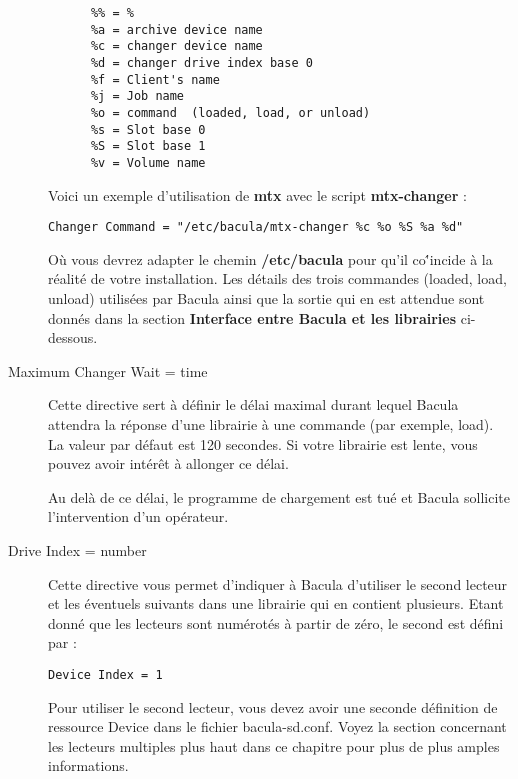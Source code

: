 \begin{description}
\footnotesize
\begin{verbatim}
      %% = %
      %a = archive device name
      %c = changer device name
      %d = changer drive index base 0
      %f = Client's name
      %j = Job name
      %o = command  (loaded, load, or unload)
      %s = Slot base 0
      %S = Slot base 1
      %v = Volume name
\end{verbatim}
\normalsize

Voici un exemple d'utilisation de {\bf mtx} avec le script {\bf mtx-changer} :

\footnotesize
\begin{verbatim}
Changer Command = "/etc/bacula/mtx-changer %c %o %S %a %d"
\end{verbatim}
\normalsize

O\`u vous devrez adapter le chemin {\bf /etc/bacula} pour qu'il co\''incide \`a 
la r\'ealit\'e de votre installation. Les d\'etails des trois commandes (loaded, 
load, unload) utilis\'ees par Bacula ainsi que la sortie qui en est attendue 
sont donn\'es dans la section {\bf Interface entre Bacula et les librairies} 
ci-dessous.

\item [Maximum Changer Wait = \lt{}time\gt{}]
   Cette directive sert \`a d\'efinir le d\'elai maximal durant lequel Bacula 
   attendra la r\'eponse d'une librairie \`a une commande (par exemple, load). 
   La valeur par d\'efaut est 120 secondes. Si votre librairie est lente, vous 
   pouvez avoir int\'er\^et \`a allonger ce d\'elai.
   
   Au del\`a de ce d\'elai, le programme de chargement est tu\'e et Bacula 
   sollicite l'intervention d'un op\'erateur.

\item [Drive Index = \lt{}number\gt{}]
   Cette directive vous permet d'indiquer \`a Bacula d'utiliser le second 
   lecteur et les \'eventuels suivants dans une librairie qui en contient 
   plusieurs. Etant donn\'e que les lecteurs sont num\'erot\'es \`a partir de 
   z\'ero, le second est d\'efini par :

\footnotesize
\begin{verbatim}
Device Index = 1
\end{verbatim}
\normalsize

Pour utiliser le second lecteur, vous devez avoir une seconde d\'efinition 
de ressource Device dans le fichier bacula-sd.conf. Voyez la section 
concernant les lecteurs multiples plus haut dans ce chapitre pour plus 
de plus amples informations.
\end{description}

